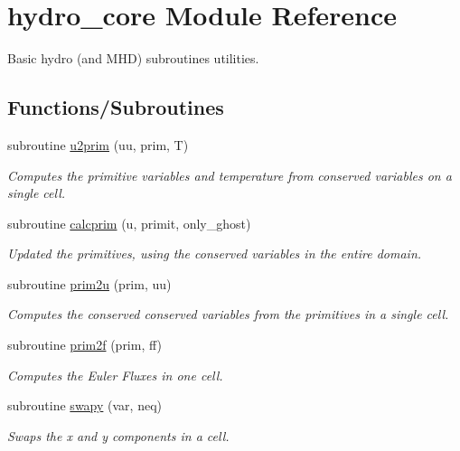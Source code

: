 \hypertarget{namespacehydro__core}{}\section{hydro\+\_\+core Module Reference}
\label{namespacehydro__core}


Basic hydro (and M\+H\+D) subroutines utilities.  


\subsection*{Functions/\+Subroutines}
\begin{DoxyCompactItemize}
\item 
subroutine \hyperlink{namespacehydro__core_a360e3d64343b30d94d270cfebc5b4eb3}{u2prim} (uu, prim, T)
\begin{DoxyCompactList}\small\item\em Computes the primitive variables and temperature from conserved variables on a single cell. \end{DoxyCompactList}\item 
subroutine \hyperlink{namespacehydro__core_a7966ebe81c520c9d275c4fd72fcb0870}{calcprim} (u, primit, only\+\_\+ghost)
\begin{DoxyCompactList}\small\item\em Updated the primitives, using the conserved variables in the entire domain. \end{DoxyCompactList}\item 
subroutine \hyperlink{namespacehydro__core_a98cafc8f97d7a1b3f8050b8e442194c3}{prim2u} (prim, uu)
\begin{DoxyCompactList}\small\item\em Computes the conserved conserved variables from the primitives in a single cell. \end{DoxyCompactList}\item 
subroutine \hyperlink{namespacehydro__core_a725c2c598f080ea420f4043dbda3f996}{prim2f} (prim, ff)
\begin{DoxyCompactList}\small\item\em Computes the Euler Fluxes in one cell. \end{DoxyCompactList}\item 
subroutine \hyperlink{namespacehydro__core_a64856096f7a7b7f65be1154d31916c2d}{swapy} (var, neq)
\begin{DoxyCompactList}\small\item\em Swaps the x and y components in a cell. \end{DoxyCompactList}\item 

\end{DoxyCompactItemize}
